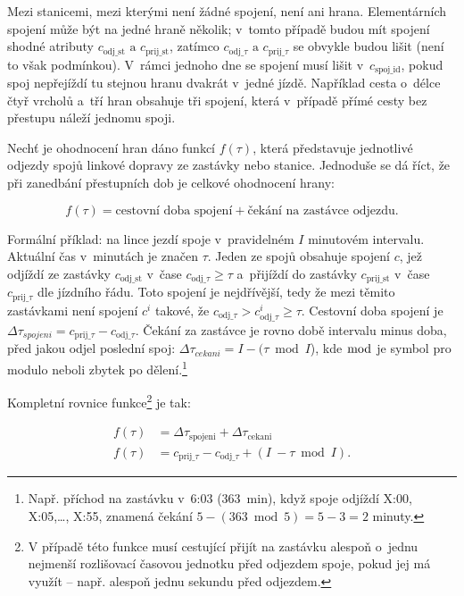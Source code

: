 Mezi stanicemi, mezi kterými není žádné spojení, není ani hrana. Elementárních spojení může být na jedné hraně několik; v~tomto případě budou mít spojení shodné atributy \(c_{\text{odj\_st}} \text{ a } c_{\text{prij\_st}}\), zatímco \(c_{\text{odj\_}\tau}\text{ a } c_{\text{prij\_}\tau}\) se obvykle budou lišit (není to však podmínkou). V~rámci jednoho dne se spojení musí lišit v~\(c_{\text{spoj\_id}}\), pokud spoj nepřejíždí tu stejnou hranu dvakrát v~jedné jízdě. Například cesta o~délce čtyř vrcholů a~tří hran obsahuje tři spojení, která v~případě přímé cesty bez přestupu náleží jednomu spoji.

Nechť je ohodnocení hran dáno funkcí $f(\tau)$, která představuje jednotlivé odjezdy spojů linkové dopravy ze zastávky nebo stanice. Jednoduše se dá říct, že při zanedbání přestupních dob je celkové ohodnocení hrany:

\[
	f(\tau) = \text{cestovní doba spojení} + \text{čekání na zastávce odjezdu}.
\]

Formální příklad: na lince jezdí spoje v~pravidelném $I$ minutovém intervalu. Aktuální čas v~minutách je značen \(\tau\). Jeden ze spojů obsahuje spojení $c$, jež odjíždí ze zastávky $c_{\text{odj\_st}}$ v~čase $c_{\text{odj\_}\tau} \geq \tau$ a~přijíždí do zastávky $c_{\text{prij\_st}}$ v~čase $c_{\text{prij\_}\tau}$ dle jízdního řádu. Toto spojení je nejdřívější, tedy že mezi těmito zastávkami není spojení \(c^i\) takové, že $c_{\text{odj\_}\tau} > c^i_{\text{odj\_}\tau} \geq \tau$. Cestovní doba spojení je $\Delta \tau_{spojeni} = c_{\text{prij\_}\tau} - c_{\text{odj\_}\tau}$. Čekání za zastávce je rovno době intervalu minus doba, před jakou odjel poslední spoj: $\Delta \tau_{cekani} =I - (\tau \bmod I$), kde $\bmod$ je symbol pro modulo neboli zbytek po dělení.\footnote{Např. příchod na zastávku v~6:03 (363~min), když spoje odjíždí X:00, X:05,\ldots, X:55, znamená čekání \(5 - (363\bmod 5) = 5 - 3 = 2\) minuty.}

Kompletní rovnice funkce\footnote{V případě této funkce musí cestující přijít na zastávku alespoň o~jednu nejmenší rozlišovací časovou jednotku před odjezdem spoje, pokud jej má využít – např. alespoň jednu sekundu před odjezdem.} je tak:

\[
\begin{aligned}
	f(\tau) &= \Delta \tau_{\text{spojeni}} + \Delta \tau_{\text{cekani}}\\
	f(\tau) &= c_{\text{prij\_}\tau} - c_{\text{odj\_}\tau} + (I~- \tau \bmod I).
\end{aligned}
\]

